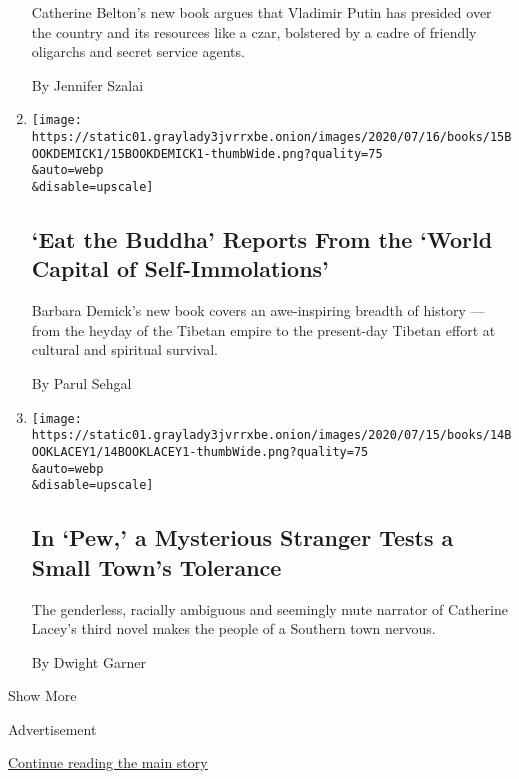 \begin{enumerate}
  Catherine Belton's new book argues that Vladimir Putin has presided
  over the country and its resources like a czar, bolstered by a cadre
  of friendly oligarchs and secret service agents.

  By Jennifer Szalai
\item
  \href{/2020/07/15/books/eat-buddha-life-death-tibetan-town-barbara-demick.html}{}

  \texttt{[image: https://static01.graylady3jvrrxbe.onion/images/2020/07/16/books/15BOOKDEMICK1/15BOOKDEMICK1-thumbWide.png?quality=75\\\&auto=webp\\\&disable=upscale]}

  \hypertarget{eat-the-buddha-reports-from-the-world-capital-of-self-immolations}{%
  \subsection{`Eat the Buddha' Reports From the `World Capital of
  Self-Immolations'}\label{eat-the-buddha-reports-from-the-world-capital-of-self-immolations}}

  Barbara Demick's new book covers an awe-inspiring breadth of history
  --- from the heyday of the Tibetan empire to the present-day Tibetan
  effort at cultural and spiritual survival.

  By Parul Sehgal
\item
  \href{/2020/07/13/books/review-pew-catherine-lacey.html}{}

  \texttt{[image: https://static01.graylady3jvrrxbe.onion/images/2020/07/15/books/14BOOKLACEY1/14BOOKLACEY1-thumbWide.png?quality=75\\\&auto=webp\\\&disable=upscale]}

  \hypertarget{in-pew-a-mysterious-stranger-tests-a-small-towns-tolerance}{%
  \subsection{In `Pew,' a Mysterious Stranger Tests a Small Town's
  Tolerance}\label{in-pew-a-mysterious-stranger-tests-a-small-towns-tolerance}}

  The genderless, racially ambiguous and seemingly mute narrator of
  Catherine Lacey's third novel makes the people of a Southern town
  nervous.

  By Dwight Garner
\end{enumerate}

Show More

Advertisement

\protect\hyperlink{after-mid1}{Continue reading the main story}

